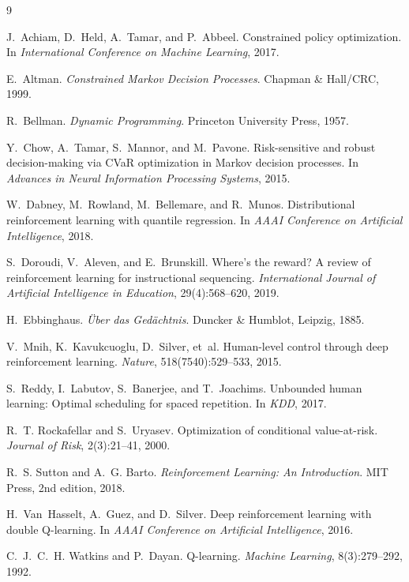 \documentclass[a4paper,11pt]{article}
\theoremstyle{definition}
\begin{document}
\begin{thebibliography}{9}

J.~Achiam, D.~Held, A.~Tamar, and P.~Abbeel.
\newblock Constrained policy optimization.
\newblock In \emph{International Conference on Machine Learning}, 2017.

E.~Altman.
\newblock \emph{Constrained Markov Decision Processes}.
\newblock Chapman \& Hall/CRC, 1999.

R.~Bellman.
\newblock \emph{Dynamic Programming}.
\newblock Princeton University Press, 1957.

Y.~Chow, A.~Tamar, S.~Mannor, and M.~Pavone.
\newblock Risk-sensitive and robust decision-making via CVaR optimization in Markov decision processes.
\newblock In \emph{Advances in Neural Information Processing Systems}, 2015.

W.~Dabney, M.~Rowland, M.~Bellemare, and R.~Munos.
\newblock Distributional reinforcement learning with quantile regression.
\newblock In \emph{AAAI Conference on Artificial Intelligence}, 2018.

S.~Doroudi, V.~Aleven, and E.~Brunskill.
\newblock Where's the reward? A review of reinforcement learning for instructional sequencing.
\newblock \emph{International Journal of Artificial Intelligence in Education}, 29(4):568--620, 2019.

H.~Ebbinghaus.
\newblock \emph{{\"U}ber das Ged{\"a}chtnis}.
\newblock Duncker \& Humblot, Leipzig, 1885.

V.~Mnih, K.~Kavukcuoglu, D.~Silver, et~al.
\newblock Human-level control through deep reinforcement learning.
\newblock \emph{Nature}, 518(7540):529--533, 2015.

S.~Reddy, I.~Labutov, S.~Banerjee, and T.~Joachims.
\newblock Unbounded human learning: Optimal scheduling for spaced repetition.
\newblock In \emph{KDD}, 2017.

R.~T. Rockafellar and S.~Uryasev.
\newblock Optimization of conditional value-at-risk.
\newblock \emph{Journal of Risk}, 2(3):21--41, 2000.

R.~S. Sutton and A.~G. Barto.
\newblock \emph{Reinforcement Learning: An Introduction}.
\newblock MIT Press, 2nd edition, 2018.

H.~Van~Hasselt, A.~Guez, and D.~Silver.
\newblock Deep reinforcement learning with double Q-learning.
\newblock In \emph{AAAI Conference on Artificial Intelligence}, 2016.

C.~J.~C.~H. Watkins and P.~Dayan.
\newblock Q-learning.
\newblock \emph{Machine Learning}, 8(3):279--292, 1992.

\end{thebibliography}
\end{document}
